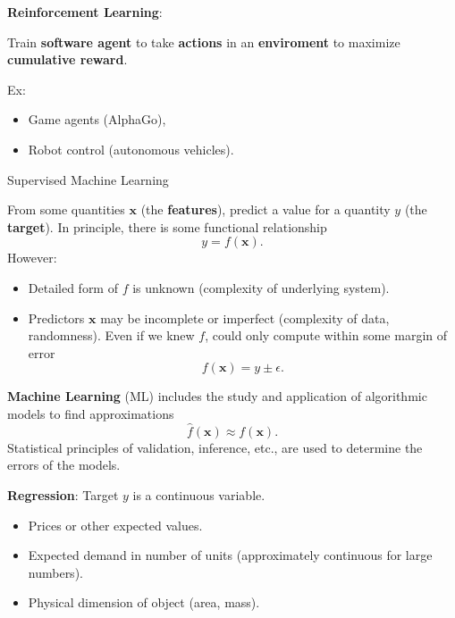\documentclass[12pt,t]{beamer}
\begin{document}
\begin{frame}

{\bf Reinforcement Learning}: 
\bigskip

Train {\bf software agent} to take {\bf actions} in an {\bf enviroment} to maximize {\bf cumulative reward}.  
\bigskip

Ex:

\begin{itemize}
\item Game agents (AlphaGo),
\item Robot control (autonomous vehicles).
\end{itemize}
\end{frame}

\begin{frame}{Supervised Machine Learning}

From some quantities $\mathbf{x}$ (the {\bf features}), predict a value for a quantity $y$ (the {\bf target}).   In principle, there is some functional relationship
$$ y = f(\mathbf{x}).$$
However:
\begin{itemize}
\item Detailed form of $f$ is unknown (complexity of underlying system).
\item Predictors $\mathbf{x}$ may be incomplete or imperfect (complexity of data, randomness). Even if we knew $f$,  could only compute within some margin of error
$$ f(\mathbf{x}) = y \pm \epsilon.$$
\end{itemize}

\end{frame}

\begin{frame}

{\bf Machine Learning} (ML)  includes the study and application of algorithmic models to find approximations  
$$ \hat{f}(\mathbf{x} )\approx f(\mathbf{x}). $$
Statistical principles of validation, inference, etc., are used to determine the errors of the models.


\bigskip

{\bf Regression}: Target $y$ is a continuous variable.
\begin{itemize}
\item Prices or other expected values. 
\item Expected demand in number of units  (approximately continuous for large numbers).
\item Physical dimension of object (area, mass).
\end{itemize}

\end{frame}
\end{document}
